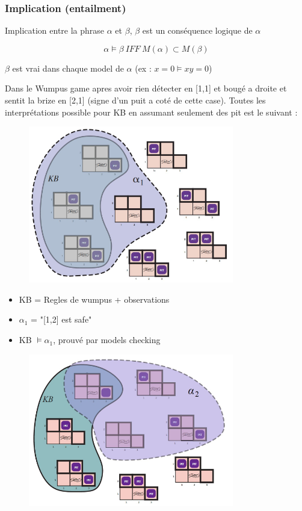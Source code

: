 	\subsubsection{Implication (entailment)}
		Implication entre la phrase $\alpha$ et $\beta$, $\beta$ est un conséquence logique de $\alpha$
		
		\begin{equation}
		\alpha \models \beta \ IFF \ M(\alpha) \subset M(\beta)
		\end{equation}
		
		$\beta$ est vrai dans chaque model de $\alpha$ (ex : $x=0 \models xy=0$)
		
		Dans le Wumpus game apres avoir rien détecter en [1,1] et bougé a droite et sentit la brize en [2,1] (signe d'un puit a coté de cette case).
		Toutes les interprétations possible pour KB en assumant seulement des pit est le suivant :
		
		\begin{figure}[H]
			\centering
			\includegraphics[width=0.8\textwidth]{img/modelsWumpus.png}
		\end{figure}
		
		\begin{itemize}
			\item KB = Regles de wumpus + observations
			\item $\alpha_1$ = "[1,2] est safe"
			\item KB $\models \alpha_1$, prouvé par models checking
		\end{itemize}
		
		\begin{figure}[H]
			\centering
			\includegraphics[width=0.8\textwidth]{img/modelsWumpus1.png}
		\end{figure}
		
